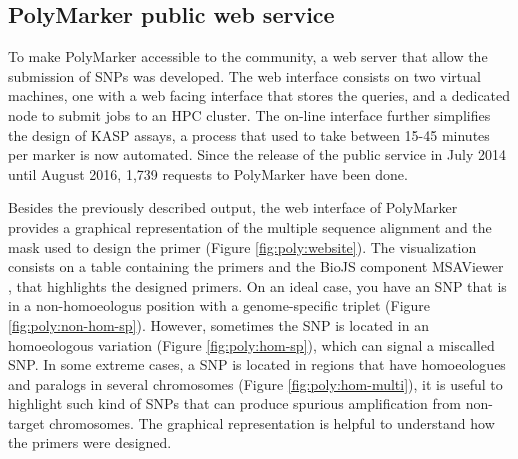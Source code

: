 \subsection{PolyMarker public web service}
To make PolyMarker accessible to the community, a web server that allow the submission of SNPs was developed. 
The web interface consists on two virtual machines, one with a web facing interface that stores the queries, and a dedicated node to submit jobs to an HPC cluster.
The on-line interface further simplifies the design of KASP assays, a process that used to take between 15-45 minutes per marker is now automated. 
Since the release of the public service in July 2014 until August 2016, 1,739 requests to PolyMarker have been done. 

Besides the previously described output, the web interface of PolyMarker provides a graphical representation of the multiple sequence alignment and the mask used to design the primer (Figure \ref{fig:poly:website}). 
The visualization consists on a table containing the primers and the BioJS component MSAViewer \citep{Yachdav2016}, that highlights the designed primers. 
On an ideal case, you have an SNP that is in a non-homoeologus position with a genome-specific triplet (Figure \ref{fig:poly:non-hom-sp}). 
However, sometimes the SNP is located in an homoeologous variation (Figure \ref{fig:poly:hom-sp}), which can signal a miscalled SNP. 
In some extreme cases, a SNP is located in regions that have homoeologues and paralogs in several chromosomes (Figure \ref{fig:poly:hom-multi}), it is useful to highlight such kind of SNPs that can produce spurious amplification from non-target chromosomes. 
The graphical representation is helpful to understand how the primers were designed.

